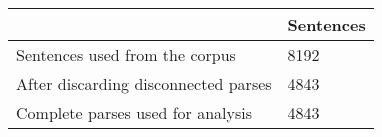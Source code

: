 	\begin{tabular}{|l|l|}
		\hline
	 & Sentences \\ 
		\hline
		Sentences used from the corpus & 8192\\ 
		\hline
		After discarding disconnected parses & 4843\\ 
		\hline
		Complete parses used for analysis & 4843\\ 
		\hline
	\end{tabular}
